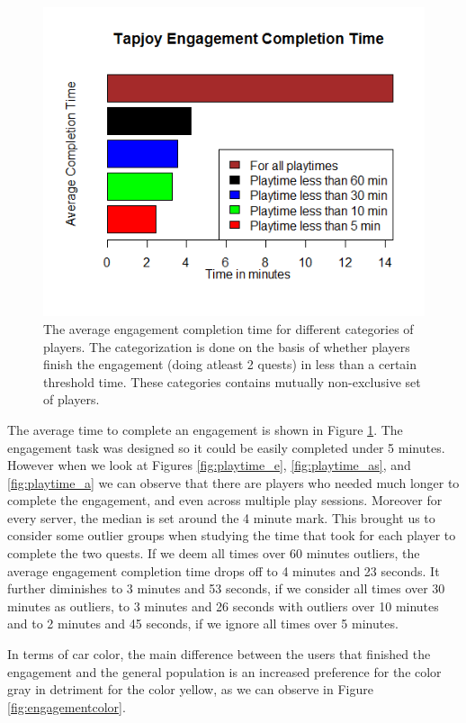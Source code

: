 \documentclass[preprint,authoryear,12pt]{elsarticle}
\begin{document}
\begin{figure}[htb]
	\begin{center}
		\includegraphics[width=.6\linewidth]{ijhcs14-img/time}
		\caption{ The average engagement completion time for different categories of players. The categorization is done on the basis of whether players finish the engagement (doing atleast 2 quests) in less than a certain threshold time. These categories contains mutually non-exclusive set of players.\label{fig:time}}
	\end{center}
\end{figure}


The average time to complete an engagement is shown in Figure \ref{fig:time}. The engagement task was designed so it could be easily completed under 5 minutes.
However when we look at Figures \ref{fig:playtime_e}, \ref{fig:playtime_as}, and \ref{fig:playtime_a} we can observe that there are players who needed much longer to complete the engagement, and even across multiple play sessions. Moreover for every server, the median is set around the 4 minute mark. This brought us to consider some outlier groups when studying the time that took for each player to complete the two quests.
If we deem all times over 60 minutes outliers, the average engagement completion time drops off to 4 minutes and 23 seconds. It further diminishes to 3 minutes and 53 seconds, if we consider all times over 30 minutes as outliers, to 3 minutes and 26 seconds with outliers over 10 minutes and to 2 minutes and 45 seconds, if we ignore all times over 5 minutes.



In terms of car color, the main difference between the users that finished the engagement and the general population is an increased preference for the color gray in detriment for the color yellow, as we can observe in Figure \ref{fig:engagementcolor}.
\end{document}
